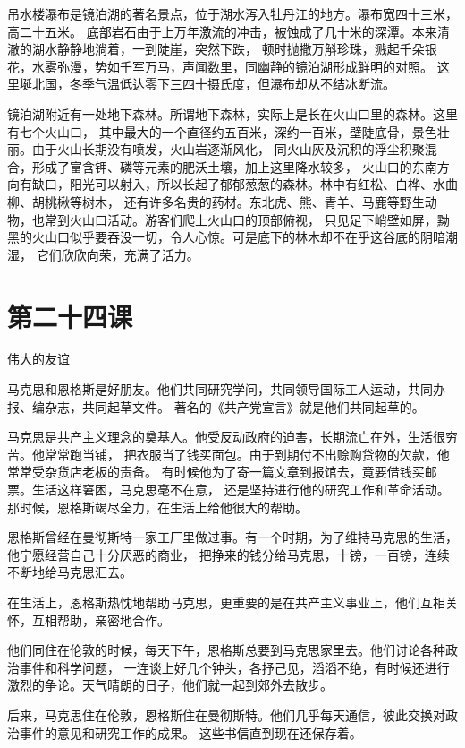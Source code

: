 \documentclass[12pt,UTF8]{ctexbook}
\begin{document}
吊水楼瀑布是镜泊湖的著名景点，位于湖水泻入牡丹江的地方。瀑布宽四十三米，高二十五米。
底部岩石由于上万年激流的冲击，被蚀成了几十米的深潭。本来清澈的湖水静静地淌着，一到陡崖，突然下跌，
顿时抛撒万斛珍珠，溅起千朵银花，水雾弥漫，势如千军万马，声闻数里，同幽静的镜泊湖形成鲜明的对照。
这里埏北国，冬季气温低达零下三四十摄氏度，但瀑布却从不结冰断流。

镜泊湖附近有一处地下森林。所谓地下森林，实际上是长在火山口里的森林。这里有七个火山口，
其中最大的一个直径约五百米，深约一百米，壁陡底骨，景色壮丽。由于火山长期没有喷发，火山岩逐渐风化，
同火山灰及沉积的浮尘积聚混合，形成了富含钾、磷等元素的肥沃土壤，加上这里降水较多，
火山口的东南方向有缺口，阳光可以射入，所以长起了郁郁葱葱的森林。林中有红松、白桦、水曲柳、胡桃楸等树木，
还有许多名贵的药材。东北虎、熊、青羊、马鹿等野生动物，也常到火山口活动。游客们爬上火山口的顶部俯视，
只见足下峭壁如屏，黝黑的火山口似乎要吞没一切，令人心惊。可是底下的林木却不在乎这谷底的阴暗潮湿，
它们欣欣向荣，充满了活力。

\section{第二十四课}

伟大的友谊

马克思和恩格斯是好朋友。他们共同研究学问，共同领导国际工人运动，共同办报、编杂志，共同起草文件。
著名的《共产党宣言》就是他们共同起草的。

马克思是共产主义理念的奠基人。他受反动政府的迫害，长期流亡在外，生活很穷苦。他常常跑当铺，
把衣服当了钱买面包。由于到期付不出赊购贷物的欠款，他常常受杂货店老板的责备。
有时候他为了寄一篇文章到报馆去，竟要借钱买邮票。生活这样窘困，马克思毫不在意，
还是坚持进行他的研究工作和革命活动。那时候，恩格斯竭尽全力，在生活上给他很大的帮助。

恩格斯曾经在曼彻斯特一家工厂里做过事。有一个时期，为了维持马克思的生活，他宁愿经营自己十分厌恶的商业，
把挣来的钱分给马克思，十镑，一百镑，连续不断地给马克思汇去。

在生活上，恩格斯热忱地帮助马克思，更重要的是在共产主义事业上，他们互相关怀，互相帮助，亲密地合作。

他们同住在伦敦的时候，每天下午，恩格斯总要到马克思家里去。他们讨论各种政治事件和科学问题，
一连谈上好几个钟头，各抒己见，滔滔不绝，有时候还进行激烈的争论。天气晴朗的日子，他们就一起到郊外去散步。

后来，马克思住在伦敦，恩格斯住在曼彻斯特。他们几乎每天通信，彼此交换对政治事件的意见和研究工作的成果。
这些书信直到现在还保存着。
\end{document}
